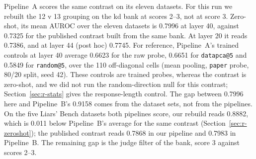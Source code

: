 Pipeline~A scores the same contrast on its eleven datasets. %
For this run we rebuilt the 12 v 13 grouping on the kd bank at scores 2--3, not at score 3. %
Zero-shot, its mean AUROC over the eleven datasets is 0.7996 at layer 40, against 0.7325 for the published contrast built from the same bank. %
At layer 20 it reads 0.7386, and at layer 44 (post hoc) 0.7745. %
For reference, Pipeline~A's trained controls at layer 40 average 0.6623 for the raw probe, 0.6651 for \texttt{datapca@5} and 0.5849 for \texttt{random@5}, over the 110 off-diagonal cells (mean pooling, \texttt{paper} probe, 80/20 split, seed 42). %
These controls are trained probes, whereas the contrast is zero-shot, and we did not run the random-direction null for this contrast; Section~\ref{sec:r-stats} gives the response-length control. %
The gap between 0.7996 here and Pipeline~B's 0.9158 comes from the dataset sets, not from the pipelines. %
On the five Liars' Bench datasets both pipelines score, our rebuild reads 0.8882, which is 0.011 below Pipeline~B's average for the same contrast (Section~\ref{sec:r-zeroshot}); the published contrast reads 0.7868 in our pipeline and 0.7983 in Pipeline~B. %
The remaining gap is the judge filter of the bank, score 3 against scores 2--3. %

